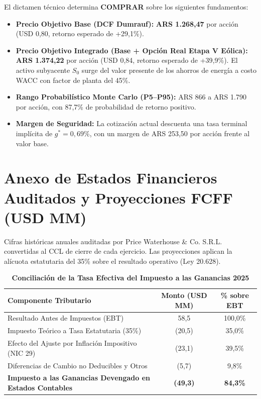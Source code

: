 \documentclass[11pt,a4paper]{article}
\begin{document}
El dictamen técnico determina \textbf{COMPRAR} sobre los siguientes fundamentos:
\begin{itemize}
    \item \textbf{Precio Objetivo Base (DCF Dumrauf):} \textbf{ARS 1.268,47} por acción (USD 0,80, retorno esperado de +29,1\%).
    \item \textbf{Precio Objetivo Integrado (Base + Opción Real Etapa V Eólica):} \textbf{ARS 1.374,22} por acción (USD 0,84, retorno esperado de +39,9\%). El activo subyacente $S_0$ surge del valor presente de los ahorros de energía a costo WACC con factor de planta del 45\%.
    \item \textbf{Rango Probabilístico Monte Carlo (P5--P95):} ARS 866 a ARS 1.790 por acción, con 87,7\% de probabilidad de retorno positivo.
    \item \textbf{Margen de Seguridad:} La cotización actual descuenta una tasa terminal implícita de $g^* = 0,69\%$, con un margen de ARS 253,50 por acción frente al valor base.
\end{itemize}

\clearpage

\section*{Anexo de Estados Financieros Auditados y Proyecciones FCFF (USD MM)}

{\small Cifras históricas anuales auditadas por Price Waterhouse \& Co. S.R.L. convertidas al CCL de cierre de cada ejercicio. Las proyecciones aplican la alícuota estatutaria del 35\% sobre el resultado operativo (Ley 20.628).}

\begin{table}[H]
\centering
\caption{\textbf{Conciliación de la Tasa Efectiva del Impuesto a las Ganancias 2025}}
\small
\begin{tabularx}{\textwidth}{Xcc}
\toprule
\textbf{Componente Tributario} & \textbf{Monto (USD MM)} & \textbf{\% sobre EBT} \\
\midrule
Resultado Antes de Impuestos (EBT) & 58,5 & 100,0\% \\
Impuesto Teórico a Tasa Estatutaria (35\%) & (20,5) & 35,0\% \\
Efecto del Ajuste por Inflación Impositivo (NIC 29) & (23,1) & 39,5\% \\
Diferencias de Cambio no Deducibles y Otros & (5,7) & 9,8\% \\
\midrule
\textbf{Impuesto a las Ganancias Devengado en Estados Contables} & \textbf{(49,3)} & \textbf{84,3\%} \\
\bottomrule
\end{tabularx}
\end{table}
\end{document}
